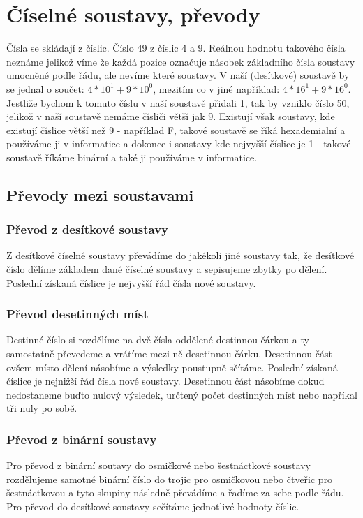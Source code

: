 \section{Číselné soustavy, převody}
\label{sec:ciselnesoustavy}
Čísla se skládají z číslic.
Číslo 49 z číslic 4 a 9.
Reálnou hodnotu takového čísla neznáme jelikož víme že každá pozice označuje násobek základního čísla soustavy umocněné podle řádu, ale nevíme které soustavy.
V naší (desítkové) soustavě by se jednal o součet: $4*10^1 + 9*10^0$, mezitím co v jiné například: $4*16^1 + 9*16^0$.
Jestliže bychom k tomuto číslu v naší soustavě přidali 1, tak by vzniklo číslo 50, jelikož v naší soustavě nemáme čísliči větší jak 9.
Existují však soustavy, kde existují číslice větší než 9 - například F, takové soustavě se říká hexademialní a používáme ji v informatice a dokonce i soustavy kde nejvyšší číslice je 1 - takové soustavě říkáme binární a také ji používáme v informatice.
\subsection{Převody mezi soustavami}
\subsubsection{Převod z desítkové soustavy}
Z desítkové číselné soustavy převádíme do jakékoli jiné soustavy tak, že desítkové číslo dělíme základem dané číselné soustavy a sepisujeme zbytky po dělení.
Poslední získaná číslice je nejvyšší řád čísla nové soustavy.
\subsubsection{Převod desetinných míst}
Destinné číslo si rozdělíme na dvě čísla oddělené destinnou čárkou a ty samostatně převedeme a vrátíme mezi ně desetinnou čárku.
Desetinnou část ovšem místo dělení násobíme a výsledky poustupně sčítáme.
Poslední získaná číslice je nejnižší řád čísla nové soustavy.
Desetinnou část násobíme dokud nedostaneme buďto nulový výsledek, určtený počet destinných míst nebo napříkal tři nuly po sobě.
\subsubsection{Převod z binární soustavy}
Pro převod z binární soutavy do osmičkové nebo šestnáctkové soustavy rozdělujeme samotné binární číslo do trojic pro osmičkovou nebo čtveřic pro šestnáctkovou a tyto skupiny následně převádíme a řadíme za sebe podle řádu.
Pro převod do desítkové soustavy sečítáme jednotlivé hodnoty číslic.
